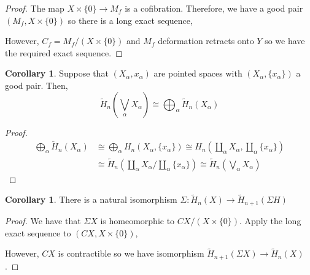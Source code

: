 \documentclass[12pt]{extarticle}
\theoremstyle{definition}
\newtheorem{corollary}[theorem]{Corollary}
\begin{document}
\begin{proof}
The map $X \times \{0\} \to M_f$ is a cofibration. Therefore, we have a good pair $(M_f, X \times \{0\})$ so there is a long exact sequence,

\begin{center}
\end{center}
However, $C_f = M_f / ( X \times \{0\} )$ and $M_f$ deformation retracts onto $Y$ so we have the required exact sequence.
\end{proof}

\begin{corollary}
Suppose that $(X_\alpha, x_\alpha)$ are pointed spaces with $(X_\alpha, \{x_\alpha\})$ a good pair. Then,
\[ \tilde{H}_n \left(\bigvee_{\alpha} X_\alpha \right) \cong \bigoplus_{\alpha} \tilde{H}_n(X_\alpha) \]
\end{corollary}

\begin{proof}
\begin{align*}
\bigoplus_{\alpha} \tilde{H}_n(X_\alpha) & \cong \bigoplus_\alpha H_n(X_\alpha, \{x_\alpha\}) \cong H_n \left( \coprod_{\alpha} X_\alpha, \coprod_{\alpha} \{x_\alpha\} \right) 
\\
& \cong \tilde{H}_n\left(  \coprod_{\alpha} X_\alpha \bigg/ \coprod_{\alpha} \{x_\alpha\}  \right) \cong \tilde{H}_n \left( \bigvee_{\alpha} X_{\alpha} \right)
\end{align*}
\end{proof}

\begin{corollary}
There is a natural isomorphism $\Sigma : \tilde{H}_n(X) \to \tilde{H}_{n+1}(\Sigma H)$
\end{corollary}

\begin{proof}
We have that $\Sigma X$ is homeomorphic to $CX/(X \times \{0\})$. Apply the long exact sequence to $(CX, X \times \{0\})$, 
\begin{center}
\end{center}
However, $CX$ is contractible so we have isomorphism $\tilde{H}_{n+1}(\Sigma X) \to \tilde{H}_n(X)$. 
\end{proof}
\end{document}
